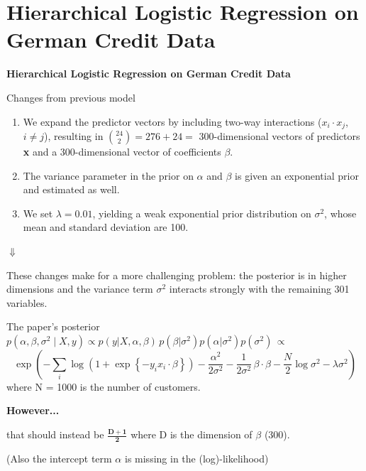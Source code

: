 \documentclass[aspectratio=43]{beamer}
\begin{document}
	\section{Hierarchical Logistic Regression on German Credit Data}
	\begin{frame}
	\begin{center}
		{\Huge \textbf{Hierarchical Logistic Regression on German Credit Data}}
	\end{center}
	\end{frame}
	\begin{frame}{Changes from previous model}
		\begin{enumerate}
			\item We expand the predictor vectors by including two-way interactions ($x_i \cdot x_j$, $i \neq j$), resulting in $\binom{24}{2} = 276 + 24 =$ 300-dimensional vectors of predictors \textbf{x} and a 300-dimensional vector of coefficients \textbf{$\beta$}.
			\item The variance parameter in
			the prior on $\alpha$ and $\beta$ is given an exponential prior and estimated as well.
			\item  We set $\lambda = 0.01$, yielding a weak exponential prior distribution on $\sigma^2$,  whose mean and standard deviation are 100.
		\end{enumerate}
		
		\begin{center}
			$\Downarrow$
			
			These changes make for a more challenging problem: the posterior is in higher dimensions and the variance term $\sigma^2$ interacts strongly with the remaining 301 variables.
		\end{center}
	\end{frame}
	
	\begin{frame}{The paper's posterior}
		$p(\alpha, \beta , \sigma^2 \mid X, y) \propto  p(y|X, \alpha, \beta) \, p(\beta| \sigma^2) p(\alpha|\sigma^2) p(\sigma^2) \, \propto
		$
		$$
		\exp\left(
		-\sum_{i}\log\!\left(1+\exp\!\left\{-y_i x_i \cdot \beta\right\}\right)
		-\frac{\alpha^2}{2\sigma^2}
		-\frac{1}{2\sigma^2}\,\beta \cdot \beta - \frac{N}{2}\log{\sigma^2} - \lambda \sigma^2
		\right)
		$$
		where N = 1000 is the number of customers.
		
		\begin{center}
			{\Large \textbf{However...}}
			
			\Large
			that should instead be $\mathbf{\frac{D+1}{2}}$ where D is the dimension of $\beta$ (300).
			
		\end{center}
		
		\begin{center}
			(Also the intercept term $\alpha$ is missing in the (log)-likelihood)
		\end{center}
	\end{frame}
\end{document}
